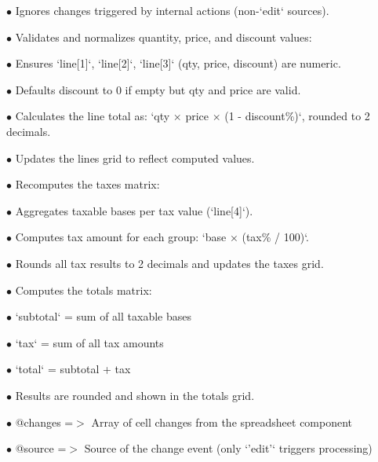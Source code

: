 \documentclass[a4paper]{article}
\begin{document}
\begin{compactitem}
\item[\color{myblue}$\bullet$] Ignores changes triggered by internal actions (non-`edit` sources).
\item[\color{myblue}$\bullet$] Validates and normalizes quantity, price, and discount values:
    \begin{compactitem}
    \item[\color{myblue}$\bullet$] Ensures `line[1]`, `line[2]`, `line[3]` (qty, price, discount) are numeric.
    \item[\color{myblue}$\bullet$] Defaults discount to 0 if empty but qty and price are valid.
    \end{compactitem}
\item[\color{myblue}$\bullet$] Calculates the line total as: `qty × price × (1 - discount\%)`, rounded to 2 decimals.
\item[\color{myblue}$\bullet$] Updates the lines grid to reflect computed values.
\item[\color{myblue}$\bullet$] Recomputes the taxes matrix:
    \begin{compactitem}
    \item[\color{myblue}$\bullet$] Aggregates taxable bases per tax value (`line[4]`).
    \item[\color{myblue}$\bullet$] Computes tax amount for each group: `base × (tax\% / 100)`.
    \end{compactitem}
\item[\color{myblue}$\bullet$] Rounds all tax results to 2 decimals and updates the taxes grid.
\item[\color{myblue}$\bullet$] Computes the totals matrix:
    \begin{compactitem}
    \item[\color{myblue}$\bullet$] `subtotal` = sum of all taxable bases
    \item[\color{myblue}$\bullet$] `tax` = sum of all tax amounts
    \item[\color{myblue}$\bullet$] `total` = subtotal + tax
    \item[\color{myblue}$\bullet$] Results are rounded and shown in the totals grid.
    \end{compactitem}
\end{compactitem}

\begin{compactitem}
\item[\color{myblue}$\bullet$] @changes =$>$ Array of cell changes from the spreadsheet component
\item[\color{myblue}$\bullet$] @source  =$>$ Source of the change event (only `'edit'` triggers processing)
\end{compactitem}
\end{document}
